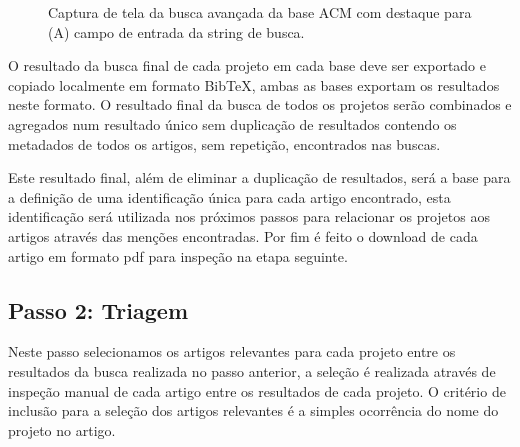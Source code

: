 \begin{figure}[h]
  \center
  \caption{Captura de tela da busca avançada da base ACM com destaque para (A) campo de entrada da string de busca.}
  \label{advanced-search-acm}
\end{figure}


O resultado da busca final de cada projeto em cada base deve ser exportado e
copiado localmente em formato BibTeX, ambas as bases exportam os resultados
neste formato. O resultado final da busca de todos os projetos serão combinados
e agregados num resultado único sem duplicação de resultados contendo os
metadados de todos os artigos, sem repetição, encontrados nas buscas.

Este resultado final, além de eliminar a duplicação de resultados, será a base
para a definição de uma identificação única para cada artigo encontrado, esta
identificação será utilizada nos próximos passos para relacionar os projetos
aos artigos através das menções encontradas. Por fim é feito o download de cada
artigo em formato pdf para inspeção na etapa seguinte.

\subsection{Passo 2: Triagem}

Neste passo selecionamos os artigos relevantes para cada projeto entre os
resultados da busca realizada no passo anterior, a seleção é realizada através
de inspeção manual de cada artigo entre os resultados de cada projeto. O
critério de inclusão para a seleção dos artigos relevantes é a simples
ocorrência do nome do projeto no artigo.

